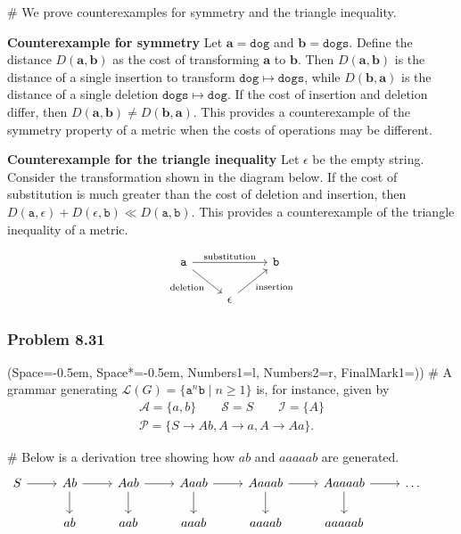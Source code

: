 \documentclass[12pt, a4paper]{article}
\newcommand{\listSpace}{-0.5em}%
\newcommand{\vect}[1]{\bm{#1}}
\begin{document}
{\begin{easylist}[enumerate]
# We prove counterexamples for symmetry and the triangle inequality.

\textbf{Counterexample for symmetry} 
Let $\vect{a} = \mathtt{dog}$ and $\vect{b} = \mathtt{dogs}$.
Define the distance $D(\vect{a}, \vect{b})$ as the cost of transforming $\vect{a}$ to $\vect{b}$.
Then $D(\vect{a}, \vect{b})$ is the distance of a single insertion to transform $\mathtt{dog} \mapsto \mathtt{dogs}$, while $D(\vect{b}, \vect{a})$ is the distance of a single deletion $\mathtt{dogs} \mapsto \mathtt{dog}$.
If the cost of insertion and deletion differ, then $D(\vect{a}, \vect{b}) \neq D(\vect{b}, \vect{a})$.
This provides a counterexample of the symmetry property of a metric when the costs of operations may be different.

\textbf{Counterexample for the triangle inequality} 
Let $\epsilon$ be the empty string.
Consider the transformation shown in the diagram below.
If the cost of substitution is much greater than the cost of deletion and insertion, then $D(\mathtt{a}, \epsilon) + D(\epsilon, \mathtt{b}) \ll D(\mathtt{a}, \mathtt{b})$. 
This provides a counterexample of the triangle inequality of a metric.

\begin{equation*}
\begin{tikzcd}
\mathtt{a} \arrow{rr}{\text{substitution}}
\arrow[swap]{dr}{\text{deletion}} &  & \mathtt{b} \\
 & \epsilon \arrow[swap]{ur}{\text{insertion}}  & 
\end{tikzcd}
\end{equation*}
\end{easylist}




\subsubsection*{Problem 8.31}
\begin{easylist}[enumerate]
	\ListProperties(Space=\listSpace, Space*=\listSpace, Numbers1=l, Numbers2=r, FinalMark1={)})
	# A grammar generating  $\mathcal{L}(G) =
	\{   \mathtt{a}^n \mathtt{b} \mid n \geq 1   \}$ is, for instance, given by
	\begin{gather*}
		\mathcal{A}  = \{a, b\} \qquad \mathcal{S}  = S \qquad
		\mathcal{I}  = \{A\}
		\\
		\mathcal{P}  = \{S \to Ab, A \to a, A \to Aa\}.
	\end{gather*}
	
	# Below is a derivation tree showing how $ab$ and $aaaaab$ are generated.
	\begin{equation*}
	\begin{tikzcd}
	S \arrow{r} & \arrow{r} \arrow{d}  Ab & \arrow{r} \arrow{d} Aab &  \arrow{r} \arrow{d} Aaab & Aaaab \arrow{d} \arrow{r} & Aaaaab \arrow{d} \arrow{r} & \dots  \\
	&  ab & aab & aaab & aaaab & aaaaab & &
	\end{tikzcd}
	\end{equation*}
\end{easylist}


}
\end{document}
